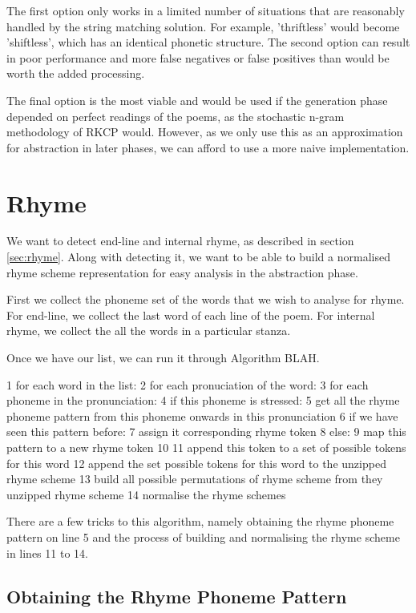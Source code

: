 The first option only works in a limited number of situations that are reasonably handled by the string matching solution. For example, 'thriftless' would become 'shiftless', which has an identical phonetic structure. The second option can result in poor performance and more false negatives or false positives than would be worth the added processing.

The final option is the most viable and would be used if the generation phase depended on perfect readings of the poems, as the stochastic n-gram methodology of RKCP would. However, as we only use this as an approximation for abstraction in later phases, we can afford to use a more naive implementation.


\section{Rhyme}

We want to detect end-line and internal rhyme, as described in section \ref{sec:rhyme}. Along with detecting it, we want to be able to build a normalised rhyme scheme representation for easy analysis in the abstraction phase. 

First we collect the phoneme set of the words that we wish to analyse for rhyme. For end-line, we collect the last word of each line of the poem. For internal rhyme, we collect the all the words in a particular stanza.

Once we have our list, we can run it through Algorithm BLAH.

1 for each word in the list:
2 	for each pronuciation of the word:
3		for each phoneme in the pronunciation:
4			if this phoneme is stressed:
5				get all the rhyme phoneme pattern from this phoneme onwards in this pronunciation
6				if we have seen this pattern before: 
7					assign it corresponding rhyme token
8				else:
9					map this pattern to a new rhyme token
10				
11				append this token to a set of possible tokens for this word				
12	append the set possible tokens for this word to the unzipped rhyme scheme
13 build all possible permutations of rhyme scheme from they unzipped rhyme scheme
14 normalise the rhyme schemes
	
There are a few tricks to this algorithm, namely obtaining the rhyme phoneme pattern on line 5 and the process of building and normalising the rhyme scheme in lines 11 to 14.

\subsection{Obtaining the Rhyme Phoneme Pattern}

